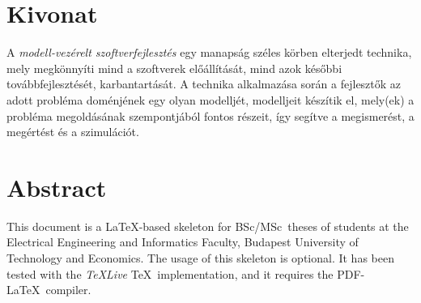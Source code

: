 \chapter*{Kivonat}

A \emph{modell-vezérelt szoftverfejlesztés} egy manapság széles körben elterjedt technika, mely megkönnyíti mind a szoftverek előállítását, mind azok későbbi továbbfejlesztését, karbantartását.
A technika alkalmazása során a fejlesztők az adott probléma doménjének egy olyan modelljét, modelljeit készítik el, mely(ek) a probléma megoldásának szempontjából fontos részeit, így segítve a megismerést, a megértést és a szimulációt.
\vfill

\chapter*{Abstract}

This document is a \LaTeX-based skeleton for BSc/MSc~theses of students at the Electrical Engineering and Informatics Faculty, Budapest University of Technology and Economics. The usage of this skeleton is optional. It has been tested with the \emph{TeXLive} \TeX~implementation, and it requires the PDF-\LaTeX~compiler.
\vfill

